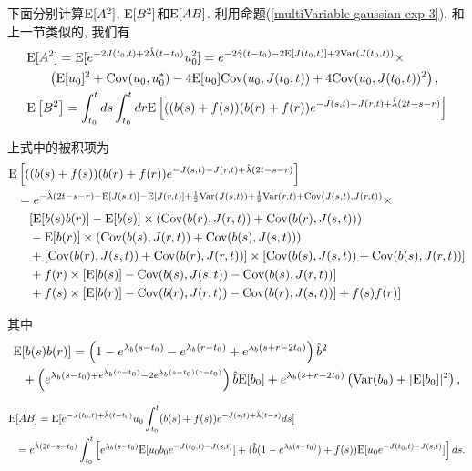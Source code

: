 \documentclass[notitlepage,cs4size,punct,oneside]{ctexrep}
\numberwithin{equation}{section}
\theoremstyle{mystyle}
\begin{document}
下面分别计算$\text{E}[A^2]$, $\text{E}[B^2]$和$\text{E}[AB]$.
利用命题(\ref{multiVariable gaussian exp 3}), 和上一节类似的, 我们有
\[
\begin{split}
\text{E}&[A^2] = \text{E}[e^{-2J(t_0, t)+2\hat\lambda(t-t_0)}u_0^2] = e^{-2\hat\gamma(t-t_0)-2\text{E}[J(t_0, t)]+2\text{Var}(J(t_0, t))}\times \\
&\quad\left(\text{E}[u_0]^2+\text{Cov}(u_0, u_0^*)-4\text{E}[u_0]\text{Cov}(u_0, J(t_0, t))+4\text{Cov}(u_0, J(t_0, t))^2\right), \\
\text{E}&\left[B^2\right] = \int_{t_0}^t ds \int_{t_0}^t dr \text{E}\left[((b(s)+f(s))(b(r)+f(r))e^{-J(s, t)-J(r, t)+\hat\lambda(2t-s-r)}\right] \\
\end{split}
\]

上式中的被积项为
\[
\begin{split}
\text{E}&\left[((b(s)+f(s))(b(r)+f(r))e^{-J(s, t)-J(r, t)+\hat\lambda(2t-s-r)}\right] \\
&= e^{-\hat\lambda(2t-s-r)-\text{E}[J(s, t)]-\text{E}[J(r, t)]+\frac{1}{2}\text{Var}(J(s, t))+\frac{1}{2}\text{Var}(r, t)+\text{Cov}(J(s, t), J(r, t))} \times \\
&\quad [\text{E}[b(s)b(r)]-\text{E}[b(s)]\times(\text{Cov}(b(r), J(r, t))+\text{Cov}(b(r), J(s, t))) \\
&\quad- \text{E}[b(r)]\times(\text{Cov}(b(s), J(r, t))+\text{Cov}(b(s), J(s, t))) \\
&\quad + [\text{Cov}(b(r), J(s, t))+\text{Cov}(b(r), J(r, t))]\times[\text{Cov}(b(s), J(s, t))+\text{Cov}(b(s), J(r, t))]\\
&\quad + f(r)\times[\text{E}[b(s)]-\text{Cov}(b(s), J(s, t))-\text{Cov}(b(s), J(r, t))]\\
&\quad +f(s)\times[\text{E}[b(r)]-\text{Cov}(b(r), J(r, t))-\text{Cov}(b(r), J(s, t))]+f(s)f(r)]
\end{split}
\]

其中
\[
\begin{split}
\text{E}&[b(s)b(r)] = \left(1-e^{\lambda_b(s-t_0)}-e^{\lambda_b(r-t_0)}+e^{\lambda_b(s+r-2t_0)}\right)\hat{b}^2 \\
&+ \left(e^{\lambda_b(s-t_0)+e^{\lambda_b(r-t_0)}-2e^{\lambda_b(s-t_0)(r-t_0)}}\right)\hat{b}\text{E}[b_0] + e^{\lambda_b(s+r-2t_0)}\left(\text{Var}(b_0)+|\text{E}[b_0]|^2\right),
\end{split}
\]

\[
\begin{split}
\text{E}&[AB] = \text{E}[e^{-J(t_0, t)+\hat{\lambda}(t-t_0)}u_0\int_{t_0}^t (b(s)+f(s))e^{-J(s, t)+\hat\lambda(t-s)}ds] \\
&= e^{\hat\lambda(2t-s-t_0)}\int_{t_0}^t \left[e^{\lambda_b(s-t_0)}\text{E}[u_0b_0e^{-J(t_0, t)-J(s, t)}]+(\hat{b}(1-e^{\lambda_b(s-t_0)})+f(s))\text{E}[u_0e^{-J(t_0, t)-J(s, t)}]\right]ds.
\end{split}
\]
\end{document}
